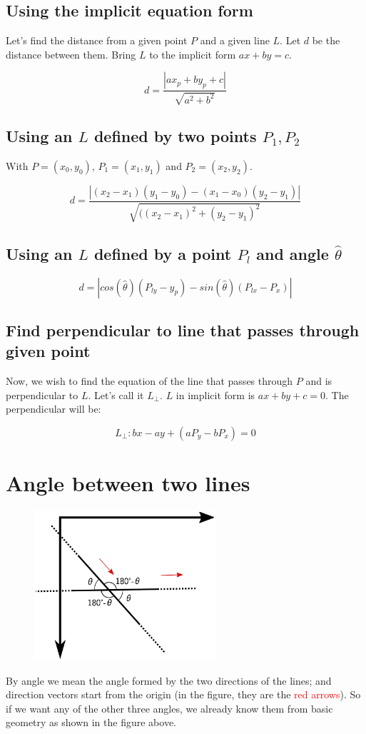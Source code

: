 \documentclass[12pt,openany,a4,usenames,dvipsnames]{book}
\begin{document}
\section{Using the implicit equation form}
Let's find the distance from a given point $P$ and a given line $L$. Let $d$ be the distance between them. Bring $L$ to the implicit form $ax+by=c$.

$$d= \frac{|ax_p+by_p+c|}{\sqrt{a^2+b^2}}$$

\section{Using an $L$ defined by two points $P_1, P_2$}
With $P=(x_0, y_0)$, $P_1 = (x_1, y_1)$ and $P_2 = (x_2, y_2)$.

$$d=\frac{|(x_2-x_1)(y_1-y_0)-(x_1-x_0)(y_2-y_1)|}{\sqrt{((x_2-x_1)^2+(y_2-y_1)^2}}$$
\section{Using an $L$ defined by a point $P_l$ and angle $\hat{θ}$}

$$d=\left|cos(\hat{θ})(P_{ly}-y_p)-sin(\hat{θ})(P_{lx} - P_x)\right|$$

\section{Find perpendicular to line that passes through given point}\label{sec:perpendicular}
Now, we wish to find the equation of the line that passes through $P$ and is perpendicular to $L$. Let's call it $L_{⊥}$. $L$ in implicit form is $ax+by+c=0$. The perpendicular will be:

$$L_{⊥}: bx-ay+(aP_y-bP_x)=0$$
\chapter{Angle between two lines}
\begin{figure}[H]
\centering
\includegraphics[width=0.6\textwidth,keepaspectratio]{figures/line_angles.pdf}
\end{figure}
By angle we mean the angle formed by the two directions of the lines; and direction vectors start from the origin (in the figure, they are the \textcolor{red}{red arrows}). So if we want any of the other three angles, we already know them from basic geometry as shown in the figure above.
\end{document}
